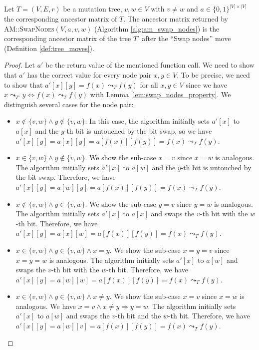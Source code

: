 \begin{theorem}
    \label{theo:swap_nodes_correctness}
    Let $T = (V, E, r)$ be a mutation tree, $v, w \in V$ with $v \neq w$ and $a \in \{0,1\}^{|V| \times |V|}$ the corresponding ancestor matrix of $T$. The ancestor matrix returned by \textsc{AM::SwapNodes}$(V, a, v, w)$ (Algorithm \ref{alg:am_swap_nodes}) is the corresponding ancestor matrix of the tree $T'$ after the ``Swap nodes'' move (Definition \ref{def:tree_moves}).
\end{theorem}

\begin{proof}
    Let $a'$ be the return value of the mentioned function call. We need to show that $a'$ has the correct value for every node pair $x, y \in V$. To be precise, we need to show that $a'[x][y] = f(x) \leadsto_T f(y)$ for all $x, y \in V$ since we have $x \leadsto_{T'} y \Leftrightarrow f(x) \leadsto_T f(y)$ with Lemma \ref{lem:swap_nodes_property}. We distinguish several cases for the node pair:
    \begin{itemize}
        \item $x \notin \{v, w\} \wedge y \notin \{v, w\}$. In this case, the algorithm initially sets $a'[x]$ to $a[x]$ and the $y$-th bit is untouched by the bit swap, so we have $a'[x][y] = a[x][y] = a[f(x)][f(y)] = f(x) \leadsto_T f(y)$.
        
        \item $x \in \{v, w\} \wedge y \notin \{v, w\}$. We show the sub-case $x = v$ since $x = w$ is analogous. The algorithm initially sets $a'[x]$ to $a[w]$ and the $y$-th bit is untouched by the bit swap. Therefore, we have $a'[x][y] = a[w][y] = a[f(x)][f(y)] = f(x) \leadsto_T f(y)$.
        
        \item $x \notin \{v, w\} \wedge y \in \{v, w\}$. We show the sub-case $y = v$ since $y = w$ is analogous. The algorithm initially sets $a'[x]$ to $a[x]$ and swaps the $v$-th bit with the $w$-th bit. Therefore, we have $a'[x][y] = a[x][w] = a[f(x)][f(y)] = f(x) \leadsto_T f(y)$.
        
        \item $x \in \{v, w\} \wedge y \in \{v, w\} \wedge x = y$. We show the sub-case $x = y = v$ since $x = y = w$ is analogous. The algorithm initially sets $a'[x]$ to $a[w]$ and swaps the $v$-th bit with the $w$-th bit. Therefore, we have $a'[x][y] = a[w][w] = a[f(x)][f(y)] = f(x) \leadsto_T f(y)$.
        
        \item $x \in \{v, w\} \wedge y \in \{v, w\} \wedge x \neq y$. We show the sub-case $x = v$ since $x = w$ is analogous. We have $x = v \wedge x \neq y \Rightarrow y = w$. The algorithm initially sets $a'[x]$ to $a[w]$ and swaps the $v$-th bit and the $w$-th bit. Therefore, we have $a'[x][y] = a[w][v] = a[f(x)][f(y)] = f(x) \leadsto_T f(y)$.
    \end{itemize}
\end{proof}


